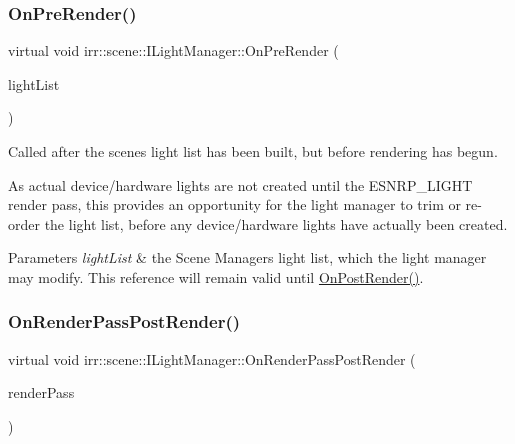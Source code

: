 \subsubsection{\texorpdfstring{On\+Pre\+Render()}{OnPreRender()}\hspace{0.1cm}{\footnotesize\ttfamily [2/2]}}
{\footnotesize\ttfamily virtual void irr\+::scene\+::\+I\+Light\+Manager\+::\+On\+Pre\+Render (\begin{DoxyParamCaption}\item[{\hyperlink{classirr_1_1core_1_1array}{core\+::array}$<$ \hyperlink{classirr_1_1scene_1_1ISceneNode}{I\+Scene\+Node} $\ast$$>$ \&}]{light\+List }\end{DoxyParamCaption})\hspace{0.3cm}{\ttfamily [pure virtual]}}



Called after the scene\textquotesingle{}s light list has been built, but before rendering has begun. 

As actual device/hardware lights are not created until the E\+S\+N\+R\+P\+\_\+\+L\+I\+G\+HT render pass, this provides an opportunity for the light manager to trim or re-\/order the light list, before any device/hardware lights have actually been created. 
\begin{DoxyParams}{Parameters}
{\em light\+List} & the Scene Manager\textquotesingle{}s light list, which the light manager may modify. This reference will remain valid until \hyperlink{classirr_1_1scene_1_1ILightManager_ac8f92f0fbd43ba9cb01b47647125a1a3}{On\+Post\+Render()}. \\
\hline
\end{DoxyParams}
\mbox{\label{classirr_1_1scene_1_1ILightManager_a189edbf3a16ebb3c82e5d9f93dd2b41b}} 
\subsubsection{\texorpdfstring{On\+Render\+Pass\+Post\+Render()}{OnRenderPassPostRender()}\hspace{0.1cm}{\footnotesize\ttfamily [1/2]}}
{\footnotesize\ttfamily virtual void irr\+::scene\+::\+I\+Light\+Manager\+::\+On\+Render\+Pass\+Post\+Render (\begin{DoxyParamCaption}\item[{\hyperlink{namespaceirr_1_1scene_a7862269bd1abc123929d4dbb8200d67f}{E\+\_\+\+S\+C\+E\+N\+E\+\_\+\+N\+O\+D\+E\+\_\+\+R\+E\+N\+D\+E\+R\+\_\+\+P\+A\+SS}}]{render\+Pass }\end{DoxyParamCaption})\hspace{0.3cm}{\ttfamily [pure virtual]}}



